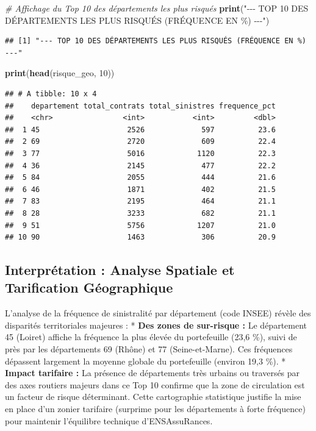 \documentclass[
]{article}
\newenvironment{Shaded}{\begin{snugshade}}{\end{snugshade}}
\newcommand{\CommentTok}[1]{\textcolor[rgb]{0.56,0.35,0.01}{\textit{#1}}}
\newcommand{\DecValTok}[1]{\textcolor[rgb]{0.00,0.00,0.81}{#1}}
\newcommand{\FunctionTok}[1]{\textcolor[rgb]{0.13,0.29,0.53}{\textbf{#1}}}
\newcommand{\NormalTok}[1]{#1}
\newcommand{\StringTok}[1]{\textcolor[rgb]{0.31,0.60,0.02}{#1}}
\begin{document}
\begin{Shaded}
\begin{Highlighting}[]
\CommentTok{\# Affichage du Top 10 des départements les plus risqués}
\FunctionTok{print}\NormalTok{(}\StringTok{"{-}{-}{-} TOP 10 DES DÉPARTEMENTS LES PLUS RISQUÉS (FRÉQUENCE EN \%) {-}{-}{-}"}\NormalTok{)}
\end{Highlighting}
\end{Shaded}

\begin{verbatim}
## [1] "--- TOP 10 DES DÉPARTEMENTS LES PLUS RISQUÉS (FRÉQUENCE EN %) ---"
\end{verbatim}

\begin{Shaded}
\begin{Highlighting}[]
\FunctionTok{print}\NormalTok{(}\FunctionTok{head}\NormalTok{(risque\_geo, }\DecValTok{10}\NormalTok{))}
\end{Highlighting}
\end{Shaded}

\begin{verbatim}
## # A tibble: 10 x 4
##    departement total_contrats total_sinistres frequence_pct
##    <chr>                <int>           <int>         <dbl>
##  1 45                    2526             597          23.6
##  2 69                    2720             609          22.4
##  3 77                    5016            1120          22.3
##  4 36                    2145             477          22.2
##  5 84                    2055             444          21.6
##  6 46                    1871             402          21.5
##  7 83                    2195             464          21.1
##  8 28                    3233             682          21.1
##  9 51                    5756            1207          21.0
## 10 90                    1463             306          20.9
\end{verbatim}

\subsection{Interprétation : Analyse Spatiale et Tarification
Géographique}\label{interpruxe9tation-analyse-spatiale-et-tarification-guxe9ographique}

L'analyse de la fréquence de sinistralité par département (code INSEE)
révèle des disparités territoriales majeures : * \textbf{Des zones de
sur-risque :} Le département 45 (Loiret) affiche la fréquence la plus
élevée du portefeuille (23,6 \%), suivi de près par les départements 69
(Rhône) et 77 (Seine-et-Marne). Ces fréquences dépassent largement la
moyenne globale du portefeuille (environ 19,3 \%). * \textbf{Impact
tarifaire :} La présence de départements très urbains ou traversés par
des axes routiers majeurs dans ce Top 10 confirme que la zone de
circulation est un facteur de risque déterminant. Cette cartographie
statistique justifie la mise en place d'un zonier tarifaire (surprime
pour les départements à forte fréquence) pour maintenir l'équilibre
technique d'ENSAssuRances.
\end{document}
